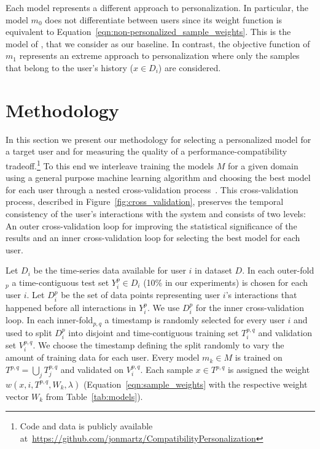 \documentclass[letterpaper]{article}
\theoremstyle{definition}
\begin{document}
Each model represents a different approach to personalization. In particular, the model $m_0$ does not differentiate between users since its weight function is equivalent to Equation~\ref{eqn:non-personalized_sample_weights}.
This is the model of \citet{bansal2019beyond}, that we consider as our baseline.
In contrast, the objective function of $m_1$ represents an extreme approach to personalization where only the samples that belong to the user's history ($x\in D_i$) are considered.





















\section{Methodology}
\label{sec:methodology}
In this  section we present  our  methodology for selecting a personalized model for a target user and for measuring the quality of a performance-compatibility tradeoff.\footnote{Code and data  is publicly available  at~\url{https://github.com/jonmartz/CompatibilityPersonalization}}
To this end we interleave training the models $M$ for a given domain using a general purpose machine learning algorithm and  choosing the  best model for each user through a nested  cross-validation process~\cite{tashman2000out}.
This cross-validation process, described in Figure~\ref{fig:cross_validation}, preserves the temporal consistency of the user's interactions with the system and consists of two levels: An outer cross-validation loop for improving the statistical significance of the results and an inner cross-validation loop for selecting the best model for each user.

Let $D_i$ be the time-series data available for user $i$ in dataset $D$. In each outer-fold$_p$ a time-contiguous test set $Y_i^p\in D_i$ (10\% in our experiments) is chosen for each user $i$.
Let $D_i^p$ be the set of data points representing user $i$'s interactions that happened before all interactions in $Y_i^p$. We use $D_i^p$ for the inner cross-validation loop.
In each inner-fold$_{p,q}$ a timestamp is randomly selected for every user $i$ and used to split $D_i^p$ into disjoint and time-contiguous training set $T_i^{p,q}$ and validation set $V_i^{p,q}$.
We choose the timestamp defining the split randomly to vary the amount of training data for each user.
Every model $m_k\in M$ is trained on $T^{p,q}=\bigcup_j T_j^{p,q}$  and validated on $V_i^{p,q}$.
Each sample $x\in T^{p,q}$ is assigned the weight $w(x,i,T^{p,q},W_k,\lambda)$ (Equation~\ref{eqn:sample_weights} with the respective weight vector $W_k$ from Table~\ref{tab:models}).
\end{document}
